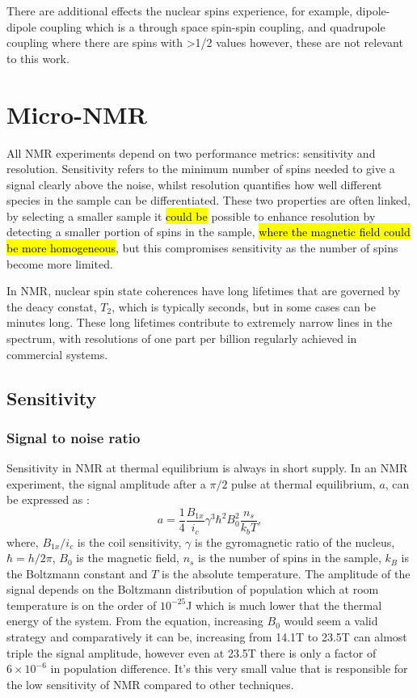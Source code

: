 There are additional effects the nuclear spins experience, for example, dipole-dipole coupling which
is a through space spin-spin coupling, and quadrupole coupling where there are spins with >1/2 values
however, these are not relevant to this work.

\newpage

\section{Micro-NMR}\label{Micro-NMR}

All NMR experiments depend on two performance metrics: sensitivity and resolution. Sensitivity
refers to the minimum number of spins needed to give a signal clearly above the noise, whilst resolution
quantifies how well different species in the sample can be differentiated. These two properties
are often linked, by selecting a smaller sample it \hl{could be} possible to enhance resolution by detecting
a smaller portion of spins in the sample, \hl{where the magnetic field could be more homogeneous}, but this compromises sensitivity as the number of spins become more limited.

 In NMR, nuclear spin state coherences have long lifetimes that are governed by the deacy constat, $T_2$, which is
 typically seconds, but in some cases can be minutes long. These long lifetimes contribute to extremely
 narrow lines in the spectrum, with resolutions of one part per billion regularly achieved in
 commercial systems.

 \subsection{Sensitivity}

 \subsubsection{Signal to noise ratio}


 Sensitivity in NMR at thermal equilibrium is always in short supply. In an NMR experiment, the signal amplitude after a $\pi/2$ pulse
 at thermal equilibrium, $a$, can be expressed as :
\begin{equation}
 a = \frac{1}{4}\frac{B_{1x}}{i_c}\gamma^3\hbar^2B_0^2\frac{n_s}{k_bT},
\end{equation}
where, $B_{1x}/i_c$ is the coil sensitivity, $\gamma$ is the gyromagnetic ratio of the nucleus,$\hbar = h/2\pi$, $B_0$ is the magnetic field, $n_s$ is
the number of spins in the sample, $k_B$ is the Boltzmann constant and $T$ is the absolute temperature. The amplitude
of the signal depends on the Boltzmann distribution of population which at room temperature is on the order of $10^{-25}$J
which is much lower that the thermal energy of the system. From the equation, increasing $B_0$ would seem a
valid strategy and comparatively it can be, increasing from 14.1T to 23.5T can almost triple the signal amplitude,
however even at 23.5T there is only a factor of ~$6\times10^{-6}$ in population difference. It's this
very small value that is responsible for the low sensitivity of NMR compared to other techniques.

